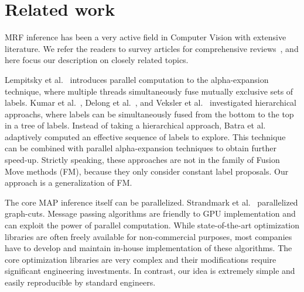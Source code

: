 \section{Related work}


MRF inference has been a very active field in Computer Vision with
extensive literature. We refer the readers to survey articles for
comprehensive
reviews~\cite{middlebury_mrf,comparative_study_of_modern_inference}, and
here focus our description on closely related topics.


\noindent Lempitsky et
al.~\cite{fusion_moves_for_markov_random_field_optimization}
introduces parallel computation to the alpha-expansion technique,
where multiple threads simultaneously fuse mutually exclusive sets of
labels. Kumar et al.~\cite{hierarchical_graph_cuts_kumar_and_koller},
Delong et al.~\cite{delong_hierarchical_fusion}, and Veksler et
al.~\cite{olga_hierarchical_alpha_expansion} investigated hierarchical
approachs, where labels can be simultaneously fused from the bottom to
the top in a tree of labels.
% 
Instead of taking a hierarchical approach, Batra et
al.~\cite{Dhruv_pushmeet_making_the_right_move} adaptively computed an
effective sequence of labels to explore. This technique can be combined
with parallel alpha-expansion techniques to obtain further speed-up.
%
Strictly speaking, these approaches are not in the family of Fusion Move
methods (FM), because they only consider constant label proposals. Our
approach is a generalization of FM.



\noindent The core MAP inference itself can be parallelized.  Strandmark
et al.~\cite{strandmark_parallel} parallelized graph-cuts.
%
Message passing algorithms are friendly to GPU implementation and can
exploit the power of parallel computation.
%
%
While state-of-the-art optimization libraries are often freely available
for non-commercial purposes, most companies have to develop and maintain
in-house implementation of these algorithms.  The core optimization
libraries are very complex and their modifications require significant
engineering investments. In contrast, our idea is extremely simple and
easily reproducible by standard engineers.





